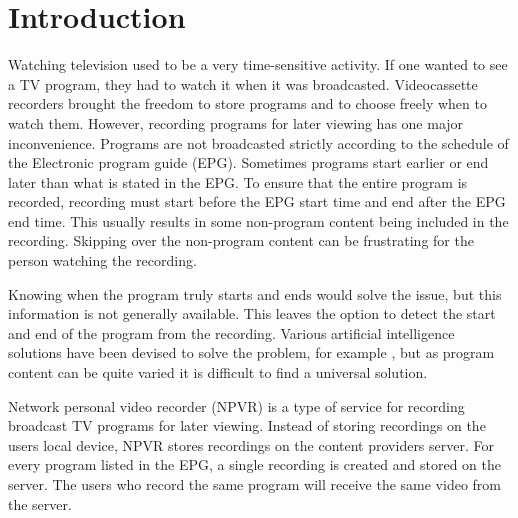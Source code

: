 \section{Introduction} \label{sec:intro}

Watching television used to be a very time-sensitive activity. If one wanted to see a TV program, they had to watch it when it was broadcasted. Videocassette recorders %
brought the freedom to store programs and to choose freely when to watch them. However, recording programs for later viewing has one major inconvenience. Programs are not broadcasted strictly according to the schedule of the Electronic program guide (EPG). Sometimes programs start earlier or end later than what is stated in the EPG.
To ensure that the entire program is recorded, recording must start before the EPG start time and end after the EPG end time. %
This usually results in some non-program content being included in the recording. Skipping over the non-program content can be frustrating for the person watching the recording.

Knowing when the program truly starts and ends would solve the issue, but this information is not generally available. %
This leaves the option to detect the start and end of the program from the recording. Various artificial intelligence solutions have been devised to solve the problem, for example \cite{berraniNonsupervisedApproachRepeated2008} \cite{ibrahimTVStreamStructuring2011} \cite{kompatsiarisTVContentAnalysis2012} \cite{mansonAutomaticTVBroadcast2010}, but as program content can be quite varied it is difficult to find a universal solution. 


Network personal video recorder (NPVR) is a type of service for recording broadcast TV programs for later viewing. Instead of storing recordings on the users local device, NPVR stores recordings on the content providers server. For every program listed in the EPG, a single recording is created and stored on the server. The users who record the same program will receive the same video from the server.

